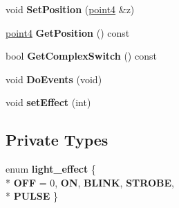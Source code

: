 \begin{DoxyCompactItemize}
\item 
\hypertarget{class_light_source_a16db60b10fc3490d2940c150e29282e2}{void {\bfseries Set\-Position} (\hyperlink{struct_angel_1_1vec4}{point4} \&z)}\label{class_light_source_a16db60b10fc3490d2940c150e29282e2}

\item 
\hypertarget{class_light_source_a516709d4d71fa7179b006df318ec3ecb}{\hyperlink{struct_angel_1_1vec4}{point4} {\bfseries Get\-Position} () const }\label{class_light_source_a516709d4d71fa7179b006df318ec3ecb}

\item 
\hypertarget{class_light_source_aef1a1468f582bade33af96d96e9d50db}{bool {\bfseries Get\-Complex\-Switch} () const }\label{class_light_source_aef1a1468f582bade33af96d96e9d50db}

\item 
\hypertarget{class_light_source_a8b565d411a56940055ec3f07a401a856}{void {\bfseries Do\-Events} (void)}\label{class_light_source_a8b565d411a56940055ec3f07a401a856}

\item 
\hypertarget{class_light_source_a06c1f646e7d2ca223ab3627c1f713964}{void {\bfseries set\-Effect} (int)}\label{class_light_source_a06c1f646e7d2ca223ab3627c1f713964}

\end{DoxyCompactItemize}
\subsection*{Private Types}
\begin{DoxyCompactItemize}
\item 
enum {\bfseries light\-\_\-effect} \{ \\*
{\bfseries O\-F\-F} = 0, 
{\bfseries O\-N}, 
{\bfseries B\-L\-I\-N\-K}, 
{\bfseries S\-T\-R\-O\-B\-E}, 
\\*
{\bfseries P\-U\-L\-S\-E}
 \}
\end{DoxyCompactItemize}
